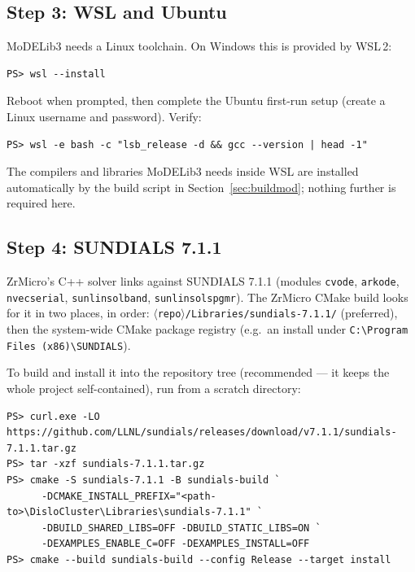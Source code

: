 \documentclass[11pt]{article}
\newcommand{\ZrM}{\textsf{ZrMicro}}
\newcommand{\MoD}{\textsf{MoDELib3}}
\newcommand{\code}[1]{\texttt{\small #1}}
\newcommand{\file}[1]{\texttt{\footnotesize #1}}
\begin{document}
\subsection{Step 3: WSL and Ubuntu}
\label{sec:wslinstall}

\MoD{} needs a Linux toolchain. On Windows this is provided by WSL\,2:

\begin{lstlisting}[style=ps]
PS> wsl --install
\end{lstlisting}

Reboot when prompted, then complete the Ubuntu first-run setup (create a
Linux username and password). Verify:

\begin{lstlisting}[style=ps]
PS> wsl -e bash -c "lsb_release -d && gcc --version | head -1"
\end{lstlisting}

The compilers and libraries \MoD{} needs inside WSL are installed
automatically by the build script in Section~\ref{sec:buildmod}; nothing
further is required here.

\subsection{Step 4: SUNDIALS 7.1.1}
\label{sec:sundials}

\ZrM{}'s C++ solver links against SUNDIALS 7.1.1 (modules \code{cvode},
\code{arkode}, \code{nvecserial}, \code{sunlinsolband},
\code{sunlinsolspgmr}). The \ZrM{} CMake build looks for it in two places, in
order: \file{$\langle$repo$\rangle$/Libraries/\allowbreak sundials-7.1.1/}
(preferred),
then the system-wide CMake package registry (e.g.\ an install under
\file{C:\textbackslash Program Files (x86)\textbackslash SUNDIALS}).

To build and install it into the repository tree (recommended --- it keeps
the whole project self-contained), run from a scratch directory:

\begin{lstlisting}[style=ps]
PS> curl.exe -LO https://github.com/LLNL/sundials/releases/download/v7.1.1/sundials-7.1.1.tar.gz
PS> tar -xzf sundials-7.1.1.tar.gz
PS> cmake -S sundials-7.1.1 -B sundials-build `
      -DCMAKE_INSTALL_PREFIX="<path-to>\DisloCluster\Libraries\sundials-7.1.1" `
      -DBUILD_SHARED_LIBS=OFF -DBUILD_STATIC_LIBS=ON `
      -DEXAMPLES_ENABLE_C=OFF -DEXAMPLES_INSTALL=OFF
PS> cmake --build sundials-build --config Release --target install
\end{lstlisting}
\end{document}
